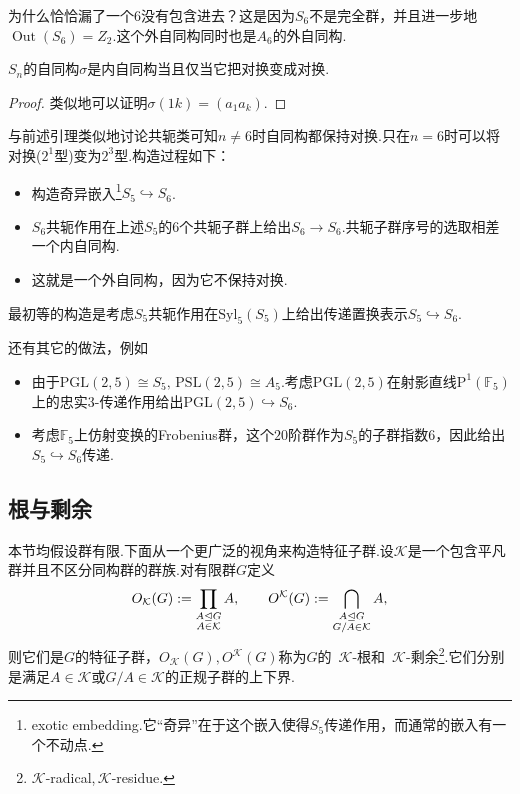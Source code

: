 为什么恰恰漏了一个$6$没有包含进去？这是因为$S_6$不是完全群，并且进一步地$\operatorname*{Out}(S_6)=Z_2$.这个外自同构同时也是$A_6$的外自同构.

\begin{lemma*}
	$S_n$的自同构$\sigma$是内自同构当且仅当它把对换变成对换.
\end{lemma*}
\begin{proof}
	类似地可以证明$\sigma(1k)=(a_1a_k)$.
\end{proof}

与前述引理类似地讨论共轭类可知$n\ne 6$时自同构都保持对换.只在$n=6$时可以将对换($2^1$型)变为$2^3$型.构造过程如下：
\begin{itemize}
	\item 构造奇异嵌入\footnote{exotic embedding.它“奇异”在于这个嵌入使得$S_5$传递作用，而通常的嵌入有一个不动点.}$S_5\hookrightarrow S_6$.
	\item $S_6$共轭作用在上述$S_5$的$6$个共轭子群上给出$S_6\to S_6$.共轭子群序号的选取相差一个内自同构.
	\item 这就是一个外自同构，因为它不保持对换.
\end{itemize}

最初等的构造是考虑$S_5$共轭作用在$\mathrm{Syl}_5(S_5)$上给出传递置换表示$S_5\hookrightarrow S_6$.

\begin{remark}
	还有其它的做法，例如
	\begin{itemize}
		\item 由于$\mathrm{PGL}(2,5)\cong S_5,\,\mathrm{PSL}(2,5)\cong A_5$.考虑$\mathrm{PGL}(2,5)$在射影直线$\bm{\mathrm P}^1(\mathbb{F}_5)$上的忠实$3$-传递作用给出$\mathrm{PGL}(2,5)\hookrightarrow S_6$.
		\item 考虑$\mathbb{F}_5$上仿射变换的Frobenius群，这个$20$阶群作为$S_5$的子群指数$6$，因此给出$S_5\hookrightarrow S_6$传递.
	\end{itemize}
\end{remark}

\subsection{根与剩余}
{\heiti 本节均假设群有限}.下面从一个更广泛的视角来构造特征子群.设$\mathcal{K}$是一个包含平凡群并且不区分同构群的群族.对有限群$G$定义
\[
	O_{\mathcal{K}}(G):=\prod_{\substack{A\trianglelefteq G\\ A\in\mathcal{K}}}A,\qquad O^{\mathcal{K}}(G):=\bigcap_{\substack{A\trianglelefteq G\\ G/A\in\mathcal{K}}}A,
\]
则它们是$G$的特征子群，$O_{\mathcal{K}}(G),O^{\mathcal{K}}(G)$称为$G$的~{\heiti $\mathcal{K}$-根}和~{\heiti $\mathcal{K}$-剩余}\footnote{$\mathcal{K}$-radical,\,$\mathcal{K}$-residue.}.它们分别是满足$A\in\mathcal{K}$或$G/A\in\mathcal{K}$的正规子群的上下界.

